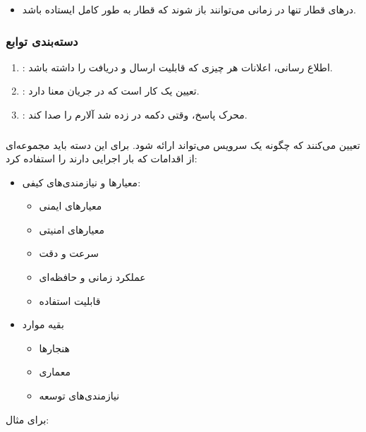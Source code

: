 \begin{itemize}
    \item در‌های قطار تنها در زمانی می‌توانند باز شوند که قطار به طور کامل ایستاده باشد.
\end{itemize}

\subsubsection*{دسته‌بندی توابع}

\begin{enumerate}
    \item {}: اطلاع رسانی، اعلانات هر چیزی که قابلیت ارسال و
    دریافت را داشته باشد.
    \item {}: تعیین  یک کار است که در جریان معنا دارد.
    \item {}: محرک پاسخ، وقتی دکمه در  زده شد آلارم را
    صدا کند.
\end{enumerate}

\subsubsection{}

تعیین می‌کنند که چگونه یک سرویس می‌تواند ارائه شود. برای این دسته باید مجموعه‌ای
از اقدامات که بار اجرایی دارند را استفاده کرد:

\begin{itemize}
    \item معیار‌ها و نیازمندی‌های کیفی:
    \begin{itemize}
        \item معیار‌های ایمنی
        \item معیار‌‌های امنیتی
        \item سرعت و دقت
        \item عملکرد زمانی و حافظه‌ای
        \item قابلیت استفاده
    \end{itemize}
    \item بقیه موارد
    \begin{itemize}
        \item هنجار‌ها
        \item معماری
        \item نیازمندی‌های توسعه 
    \end{itemize}
\end{itemize}

برای مثال:


